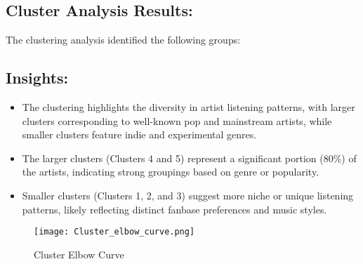 \documentclass[12pt]{article}
\begin{document}
\begin{itemize}
\subsection*{Cluster Analysis Results:}
The clustering analysis identified the following groups:


\begin{table}[ht]
\centering
{}
\caption{Clustering Results and Artist Distribution}
\end{table}

\subsection*{Insights:}
\begin{itemize}
    \item The clustering highlights the diversity in artist listening patterns, with larger clusters corresponding to well-known pop and mainstream artists, while smaller clusters feature indie and experimental genres.
    \item The larger clusters (Clusters 4 and 5) represent a significant portion (80\%) of the artists, indicating strong groupings based on genre or popularity.
    \item Smaller clusters (Clusters 1, 2, and 3) suggest more niche or unique listening patterns, likely reflecting distinct fanbase preferences and music styles.
\end{itemize}
\begin{figure}
    \centering
    \texttt{[image: Cluster\_elbow\_curve.png]}
    \caption{Cluster Elbow Curve}
    \label{fig:enter-label}
\end{figure}

\end{itemize}
\end{document}
